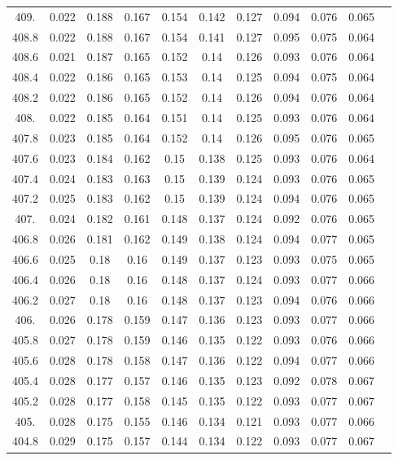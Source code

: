 \documentclass[12pt]{ctexart}
\numberwithin{equation}{section}
\begin{document}
\begin{longtable}{ccccccccccc}
409.	&	0.022	&	0.188	&	0.167	&	0.154	&	0.142	&	0.127	&	0.094	&	0.076	&	0.065	\\
408.8	&	0.022	&	0.188	&	0.167	&	0.154	&	0.141	&	0.127	&	0.095	&	0.075	&	0.064	\\
408.6	&	0.021	&	0.187	&	0.165	&	0.152	&	0.14	&	0.126	&	0.093	&	0.076	&	0.064	\\
408.4	&	0.022	&	0.186	&	0.165	&	0.153	&	0.14	&	0.125	&	0.094	&	0.075	&	0.064	\\
408.2	&	0.022	&	0.186	&	0.165	&	0.152	&	0.14	&	0.126	&	0.094	&	0.076	&	0.064	\\
408.	&	0.022	&	0.185	&	0.164	&	0.151	&	0.14	&	0.125	&	0.093	&	0.076	&	0.064	\\
407.8	&	0.023	&	0.185	&	0.164	&	0.152	&	0.14	&	0.126	&	0.095	&	0.076	&	0.065	\\
407.6	&	0.023	&	0.184	&	0.162	&	0.15	&	0.138	&	0.125	&	0.093	&	0.076	&	0.064	\\
407.4	&	0.024	&	0.183	&	0.163	&	0.15	&	0.139	&	0.124	&	0.093	&	0.076	&	0.065	\\
407.2	&	0.025	&	0.183	&	0.162	&	0.15	&	0.139	&	0.124	&	0.094	&	0.076	&	0.065	\\
407.	&	0.024	&	0.182	&	0.161	&	0.148	&	0.137	&	0.124	&	0.092	&	0.076	&	0.065	\\
406.8	&	0.026	&	0.181	&	0.162	&	0.149	&	0.138	&	0.124	&	0.094	&	0.077	&	0.065	\\
406.6	&	0.025	&	0.18	&	0.16	&	0.149	&	0.137	&	0.123	&	0.093	&	0.075	&	0.065	\\
406.4	&	0.026	&	0.18	&	0.16	&	0.148	&	0.137	&	0.124	&	0.093	&	0.077	&	0.066	\\
406.2	&	0.027	&	0.18	&	0.16	&	0.148	&	0.137	&	0.123	&	0.094	&	0.076	&	0.066	\\
406.	&	0.026	&	0.178	&	0.159	&	0.147	&	0.136	&	0.123	&	0.093	&	0.077	&	0.066	\\
405.8	&	0.027	&	0.178	&	0.159	&	0.146	&	0.135	&	0.122	&	0.093	&	0.076	&	0.066	\\
405.6	&	0.028	&	0.178	&	0.158	&	0.147	&	0.136	&	0.122	&	0.094	&	0.077	&	0.066	\\
405.4	&	0.028	&	0.177	&	0.157	&	0.146	&	0.135	&	0.123	&	0.092	&	0.078	&	0.067	\\
405.2	&	0.028	&	0.177	&	0.158	&	0.145	&	0.135	&	0.122	&	0.093	&	0.077	&	0.067	\\
405.	&	0.028	&	0.175	&	0.155	&	0.146	&	0.134	&	0.121	&	0.093	&	0.077	&	0.066	\\
404.8	&	0.029	&	0.175	&	0.157	&	0.144	&	0.134	&	0.122	&	0.093	&	0.077	&	0.067	\\

\end{longtable}
\end{document}
